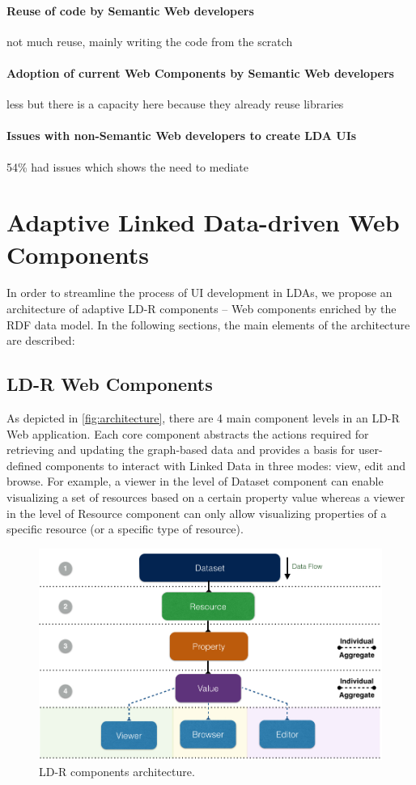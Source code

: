 \documentclass{acm_proc_article-sp}
\begin{document}
 
\paragraph{Reuse of code by Semantic Web developers}
not much reuse, mainly writing the code from the scratch

\paragraph{Adoption of current Web Components by Semantic Web developers}
less but there is a capacity here because they already reuse libraries

\paragraph{Issues with non-Semantic Web developers to create LDA UIs}
54\% had issues which shows the need to mediate

\section{Adaptive Linked Data-driven Web Components}
In order to streamline the process of UI development in LDAs, we propose an architecture of adaptive LD-R components -- Web components enriched by the RDF data model.
In the following sections, the main elements of the architecture are described:

\subsection{LD-R Web Components}
As depicted in \autoref{fig:architecture}, there are 4 main component levels in an LD-R Web application.
Each core component abstracts the actions required for retrieving and updating the graph-based data and provides a basis for user-defined components to interact with Linked Data in three modes: view, edit and browse.
For example, a viewer in the level of Dataset component can enable visualizing a set of resources based on a certain property value whereas a viewer in the level of Resource component can only allow visualizing properties of a specific resource (or a specific type of resource).

\begin{figure}[tb]
  \includegraphics[width=1\linewidth]{images/architecture.jpg}
  \caption{LD-R components architecture.}
  \label{fig:architecture}
\end{figure}
\end{document}
